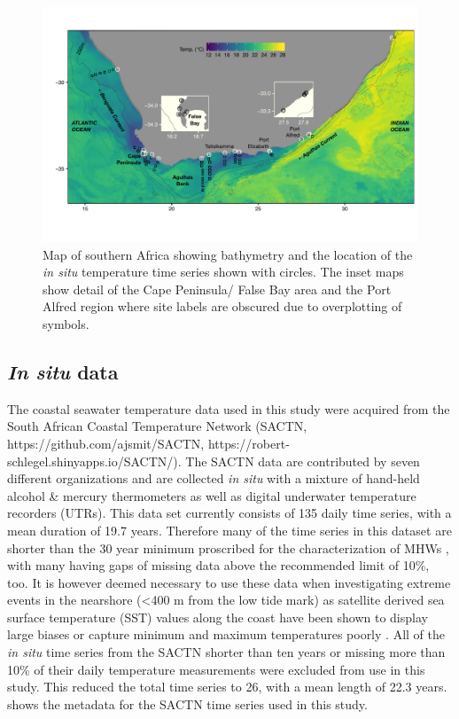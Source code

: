 \documentclass[a4paper,10pt,review]{elsarticle}
\begin{document}
\begin{figure}
\includegraphics[width=1.0\textwidth]{figure_1.pdf}
\caption{Map of southern Africa showing bathymetry and the location of the \emph{in situ} temperature time series shown with circles. The inset maps show detail of the Cape Peninsula/ False Bay area and the Port Alfred region where site labels are obscured due to overplotting of symbols.}
\label{figure1}
\end{figure}

\subsection{\emph{In situ} data}
The coastal seawater temperature data used in this study were acquired from the South African Coastal Temperature Network (SACTN, https://github.com/ajsmit/SACTN, https://robert-schlegel.shinyapps.io/SACTN/). The SACTN data are contributed by seven different organizations and are collected \emph{in situ} with a mixture of hand-held alcohol \& mercury thermometers as well as digital underwater temperature recorders (UTRs). This data set currently consists of 135 daily time series, with a mean duration of 19.7 years. Therefore many of the time series in this dataset are shorter than the 30 year minimum proscribed for the characterization of MHWs \citep{Hobday2016}, with many having gaps of missing data above the recommended limit of 10\%, too. It is however deemed necessary to use these data when investigating extreme events in the nearshore (<400 m from the low tide mark) as satellite derived sea surface temperature (SST) values along the coast have been shown to display large biases \citep{Smit2013} or capture minimum and maximum temperatures poorly \citep{Smale2009, Castillo2010}. All of the \emph{in situ} time series from the SACTN shorter than ten years or missing more than 10\% of their daily temperature measurements were excluded from use in this study. This reduced the total time series to 26, with a mean length of 22.3 years.  shows the metadata for the SACTN time series used in this study.
\end{document}
